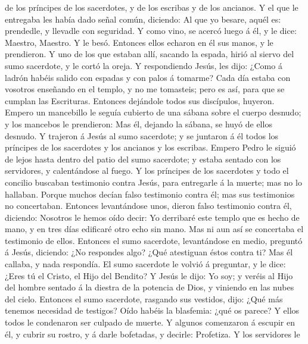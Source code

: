 de los príncipes de los sacerdotes, y de los escribas y de los ancianos.
 Y el que le entregaba les había dado señal común,
diciendo: Al que yo besare, aquél es: prendedle, y llevadle con
seguridad.  Y como vino, se acercó luego á él, y le dice:
Maestro, Maestro. Y le besó.  Entonces ellos echaron en
él sus manos, y le prendieron.  Y uno de los que estaban
allí, sacando la espada, hirió al siervo del sumo sacerdote, y le cortó
la oreja.  Y respondiendo Jesús, les dijo: ¿Como á ladrón
habéis salido con espadas y con palos á tomarme?  Cada
día estaba con vosotros enseñando en el templo, y no me tomasteis; pero
es así, para que se cumplan las Escrituras.  Entonces
dejándole todos sus discípulos, huyeron.  Empero un
mancebillo le seguía cubierto de una sábana sobre el cuerpo desnudo; y
los mancebos le prendieron:  Mas él, dejando la sábana,
se huyó de ellos desnudo.  Y trajeron á Jesús al sumo
sacerdote; y se juntaron á él todos los príncipes de los sacerdotes y
los ancianos y los escribas.  Empero Pedro le siguió de
lejos hasta dentro del patio del sumo sacerdote; y estaba sentado con
los servidores, y calentándose al fuego.  Y los príncipes
de los sacerdotes y todo el concilio buscaban testimonio contra Jesús,
para entregarle á la muerte; mas no lo hallaban.  Porque
muchos decían falso testimonio contra él; mas sus testimonios no
concertaban.  Entonces levantándose unos, dieron falso
testimonio contra él, diciendo:  Nosotros le hemos oído
decir: Yo derribaré este templo que es hecho de mano, y en tres días
edificaré otro echo sin mano.  Mas ni aun así se
concertaba el testimonio de ellos.  Entonces el sumo
sacerdote, levantándose en medio, preguntó á Jesús, diciendo: ¿No
respondes algo? ¿Qué atestiguan éstos contra ti?  Mas él
callaba, y nada respondía. El sumo sacerdote le volvió á preguntar, y le
dice: ¿Eres tú el Cristo, el Hijo del Bendito?  Y Jesús
le dijo: Yo soy; y veréis al Hijo del hombre sentado á la diestra de la
potencia de Dios, y viniendo en las nubes del cielo. 
Entonces el sumo sacerdote, rasgando sus vestidos, dijo: ¿Qué más
tenemos necesidad de testigos?  Oído habéis la blasfemia:
¿qué os parece? Y ellos todos le condenaron ser culpado de muerte.
 Y algunos comenzaron á escupir en él, y cubrir su
rostro, y á darle bofetadas, y decirle: Profetiza. Y los servidores le
